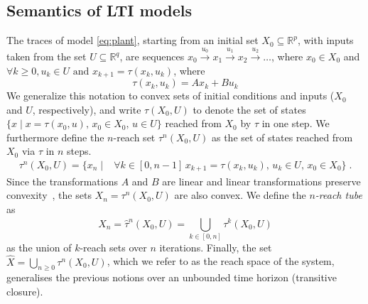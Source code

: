 \documentclass[sigconf]{llncs}
\newcommand{\mat}[1]{{#1}}
\renewcommand{\vec}[1]{{#1}}
\renewcommand{\note}[1]{\textcolor{red}{[#1]}}
\begin{document}
\subsection{Semantics of LTI models}\label{sec:model_semantics}
%
The traces of model \eqref{eq:plant}, 
starting from an initial set $X_0\subseteq \mathbb{R}^p$, 
with inputs taken from the set $U \subseteq \mathbb{R}^q$, are sequences 
$ \vec{x}_0 \xrightarrow{\vec{u}_0} \vec{x}_1 \xrightarrow{\vec{u}_1} \vec{x}_2 \xrightarrow{\vec{u}_2} \ldots $, 
%
where $ \vec{x}_0 \in X_0$ and $\forall k\geq 0, \vec{u}_k \in U \text{ and } \vec{x}_{k+1} = \tau(\vec{x}_k,\vec{u}_k) $, 
where 
%
\begin{equation}\label{equ:reachtraj}
\tau(\vec{x}_k,\vec{u}_k) = %
\mat{A}\vec{x}_k + \mat{B}\vec{u}_k
\end{equation}
%
%
We generalize this notation to convex sets of initial conditions and inputs ($X_0$ and $U$, respectively), 
and write $\tau(X_0,U)$ to denote the set of states $\{\vec{x} \mid \vec{x} = \tau(\vec{x}_0,\vec{u}),\, \vec{x}_0 \in
X_0,\, \vec{u} \in U \}$
reached from $X_0$ by $\tau$ in one step. 
%
We furthermore define the $n$-reach set $\tau^n(X_0,U)$ as the set of states reached from
$X_0$ via $\tau$ in $n$ steps.
%
\begin{align}\label{equ:reachset}
\tau^n(X_0,U) = \{\vec{x}_n \mid & 
\forall k\in [0,n-1] \, \vec{x}_{k+1}=\tau(\vec{x}_{k},\vec{u}_{k}), \,
\vec{u}_{k} \in U, \,   
\vec{x}_0 \in X_0
\} \;. 
\end{align}
%
Since the transformations $\mat{A}$ and $\mat{B}$ are linear and linear transformations preserve convexity~\cite{boyd2004convex}, 
the sets $X_n = \tau^n(X_0,U)$ are also convex.  
We define the \emph{$n$-reach tube} as 
\begin{equation}\label{equ:reachtube}
\hat{X}_n=\hat{\tau}^n(X_0,U)=\bigcup_{k\in[0,n]} \tau^k(X_0,U)
\end{equation}
as the union of $k$-reach sets over $n$ iterations. 
%
Finally, the set $\hat{X} =\bigcup_{n\geq 0} \tau^n(X_0,U)$, which we refer to as
the reach space of the system, generalises the previous notions over an unbounded
time horizon (transitive closure).
\end{document}

